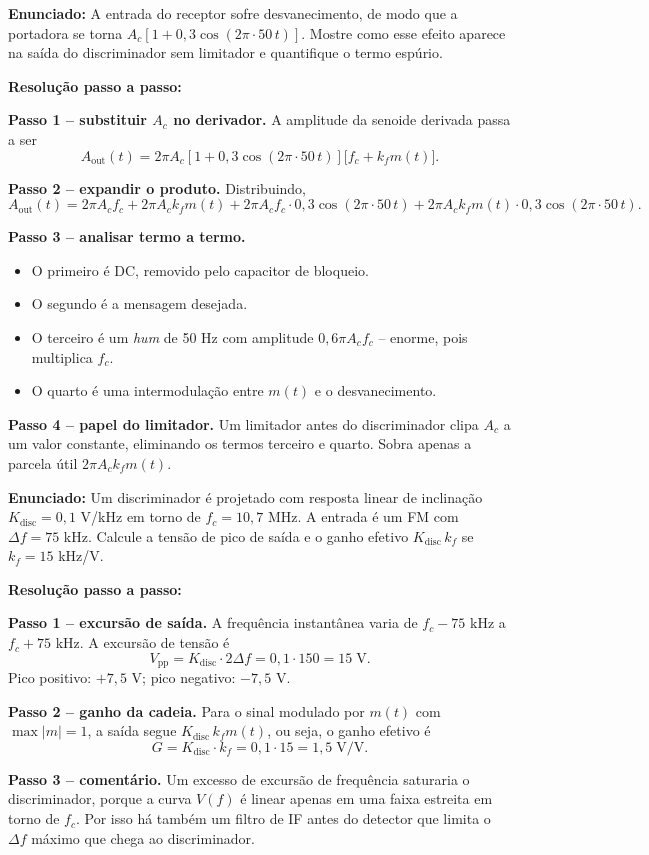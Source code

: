\documentclass[11pt,a4paper]{article}
\begin{document}
\begin{exercicio}
\textbf{Enunciado:} A entrada do receptor sofre desvanecimento, de modo que a portadora se torna $A_c[1 + 0{,}3\cos(2\pi\!\cdot\!50\,t)]$. Mostre como esse efeito aparece na saída do discriminador sem limitador e quantifique o termo espúrio.

\textbf{Resolução passo a passo:}

\textbf{Passo 1 -- substituir $A_c$ no derivador.}
A amplitude da senoide derivada passa a ser
\[
  A_{\text{out}}(t) = 2\pi A_c[1+0{,}3\cos(2\pi\!\cdot\!50\,t)]\bigl[f_c + k_f m(t)\bigr].
\]

\textbf{Passo 2 -- expandir o produto.}
Distribuindo,
\[
  A_{\text{out}}(t) = 2\pi A_c f_c + 2\pi A_c k_f m(t) + 2\pi A_c f_c\!\cdot\!0{,}3\cos(2\pi\!\cdot\!50\,t) + 2\pi A_c k_f m(t)\!\cdot\!0{,}3\cos(2\pi\!\cdot\!50\,t).
\]

\textbf{Passo 3 -- analisar termo a termo.}
\begin{itemize}
  \item O primeiro é DC, removido pelo capacitor de bloqueio.
  \item O segundo é a mensagem desejada.
  \item O terceiro é um \emph{hum} de 50 Hz com amplitude $0{,}6\pi A_c f_c$ -- enorme, pois multiplica $f_c$.
  \item O quarto é uma intermodulação entre $m(t)$ e o desvanecimento.
\end{itemize}

\textbf{Passo 4 -- papel do limitador.}
Um limitador antes do discriminador clipa $A_c$ a um valor constante, eliminando os termos terceiro e quarto. Sobra apenas a parcela útil $2\pi A_c k_f m(t)$.
\end{exercicio}

\begin{exercicio}
\textbf{Enunciado:} Um discriminador é projetado com resposta linear de inclinação $K_{\text{disc}}=0{,}1$ V/kHz em torno de $f_c=10{,}7$ MHz. A entrada é um FM com $\Delta f=75$ kHz. Calcule a tensão de pico de saída e o ganho efetivo $K_{\text{disc}}\,k_f$ se $k_f=15$ kHz/V.

\textbf{Resolução passo a passo:}

\textbf{Passo 1 -- excursão de saída.}
A frequência instantânea varia de $f_c-75$ kHz a $f_c+75$ kHz. A excursão de tensão é
\[
  V_{\text{pp}} = K_{\text{disc}}\!\cdot\!2\Delta f = 0{,}1\!\cdot\!150 = 15\;\text{V}.
\]
Pico positivo: $+7{,}5$ V; pico negativo: $-7{,}5$ V.

\textbf{Passo 2 -- ganho da cadeia.}
Para o sinal modulado por $m(t)$ com $\max|m|=1$, a saída segue $K_{\text{disc}}\,k_f m(t)$, ou seja, o ganho efetivo é
\[
  G = K_{\text{disc}}\!\cdot\!k_f = 0{,}1\!\cdot\!15 = 1{,}5\;\text{V/V}.
\]

\textbf{Passo 3 -- comentário.}
Um excesso de excursão de frequência saturaria o discriminador, porque a curva $V(f)$ é linear apenas em uma faixa estreita em torno de $f_c$. Por isso há também um filtro de IF antes do detector que limita o $\Delta f$ máximo que chega ao discriminador.
\end{exercicio}
\end{document}
